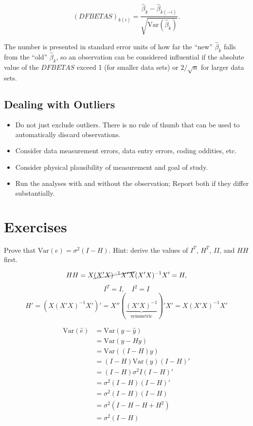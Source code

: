 \documentclass[
  letterpaper,
  DIV=11,
  numbers=noendperiod]{scrreport}
\providecommand{\tightlist}{%
  \setlength{\itemsep}{0pt}\setlength{\parskip}{0pt}}\usepackage{longtable,booktabs,array}
\begin{document}
\[(DFBETAS)_{k(i)} = \frac{\hat \beta_k - \hat \beta_{k(-i)}}{\sqrt{\text{Var}(\hat\beta_k)}}.\]

The number is presented in standard error units of how far the ``new''
\(\hat \beta_k\) falls from the ``old'' \(\hat\beta_k\), so an
observation can be considered influential if the absolute value of the
\(DFBETAS\) exceed 1 (for smaller data sets) or \(2 / \sqrt{n}\) for
larger data sets.

\hypertarget{dealing-with-outliers}{%
\subsection{Dealing with Outliers}\label{dealing-with-outliers}}

\begin{itemize}
\tightlist
\item
  Do not just exclude outliers. There is no rule of thumb that can be
  used to automatically discard observations.
\item
  Consider data measurement errors, data entry errors, coding oddities,
  etc.
\item
  Consider physical plausibility of measurement and goal of study.
\item
  Run the analyses with and without the observation; Report both if they
  differ substantially.
\end{itemize}

\hypertarget{exercises}{%
\section{Exercises}\label{exercises}}

Prove that \(\text{Var}(e) = \sigma^2(I-H)\). Hint: derive the values of
\(I^T\), \(H^T\), \(II\), and \(HH\) first.

\[HH = X\cancel{(X'X)^{-1}X'X}(X'X)^{-1}X' = H,\]
\[I^T = I, \quad I^2 = I\]
\[H' = (X(X'X)^{-1}X')' = X''(\underbrace{(X'X)^{-1}}_{\text{symmetric}})'X' = X(X'X)^{-1}X'\]

\[\begin{aligned}\text{Var}(\hat e) & = \text{Var}(y - \hat y) \\
& = \text{Var}(y - Hy) \\
& = \text{Var}((I-H)y) \\
& = (I-H)\text{Var}(y)(I-H)' \\ 
& = (I-H)\sigma^2I(I-H)' \\
& = \sigma^2(I-H)(I-H)' \\
& = \sigma^2(I-H)(I-H) \\ 
& = \sigma^2(I-H - H + H^2) \\ 
& = \sigma^2(I-H)
\end{aligned}\]
\end{document}
